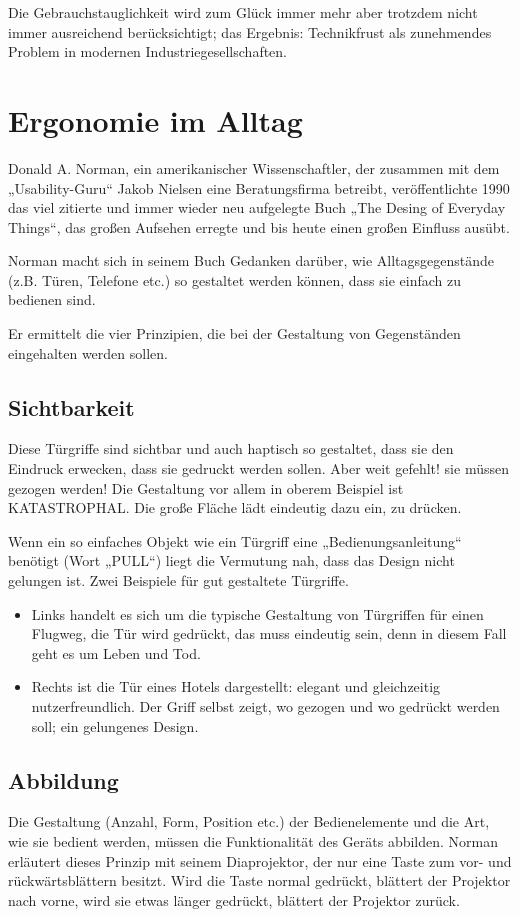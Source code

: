 Die Gebrauchstauglichkeit wird zum Glück immer mehr aber trotzdem nicht immer ausreichend berücksichtigt; das Ergebnis: Technikfrust als zunehmendes Problem in modernen Industriegesellschaften.

\section{Ergonomie im Alltag}
Donald A. Norman, ein amerikanischer Wissenschaftler, der zusammen mit dem „Usability-Guru“ Jakob Nielsen eine Beratungsfirma betreibt, veröffentlichte 1990 das viel zitierte und immer wieder neu aufgelegte Buch „The Desing of Everyday Things“, das großen Aufsehen erregte und bis heute einen großen Einfluss ausübt.
 
Norman macht sich in seinem Buch Gedanken darüber, wie Alltagsgegenstände (z.B. Türen, Telefone etc.) so gestaltet werden können, dass sie einfach zu bedienen sind. 

Er ermittelt die vier Prinzipien, die bei der Gestaltung von Gegenständen eingehalten werden sollen.

\subsection{Sichtbarkeit}
Diese Türgriffe sind sichtbar und auch haptisch so gestaltet, dass sie den Eindruck erwecken, dass sie gedruckt werden sollen. Aber weit gefehlt! sie müssen gezogen werden! Die Gestaltung vor allem in oberem Beispiel ist KATASTROPHAL. Die große Fläche lädt eindeutig dazu ein, zu drücken.

Wenn ein so einfaches Objekt wie ein Türgriff eine „Bedienungsanleitung“ benötigt (Wort „PULL“) liegt die Vermutung nah, dass das Design nicht gelungen ist.
Zwei Beispiele für gut gestaltete Türgriffe. 
\begin{itemize}
\item Links handelt es sich um die typische Gestaltung von Türgriffen für einen Flugweg, die Tür wird gedrückt, das muss eindeutig sein, denn in diesem Fall geht es um Leben und Tod. 
\item Rechts ist die Tür eines Hotels dargestellt: elegant und gleichzeitig nutzerfreundlich. Der Griff selbst zeigt, wo gezogen und wo gedrückt werden soll; ein gelungenes Design.
\end{itemize} 
\subsection{Abbildung}
Die Gestaltung (Anzahl, Form, Position etc.) der Bedienelemente und die Art, wie sie bedient werden, müssen die Funktionalität des Geräts abbilden.
Norman erläutert dieses Prinzip mit seinem Diaprojektor, der nur eine Taste zum vor- und rückwärtsblättern besitzt. Wird die Taste normal gedrückt, blättert der Projektor nach vorne, wird sie etwas länger gedrückt, blättert der Projektor zurück. 

